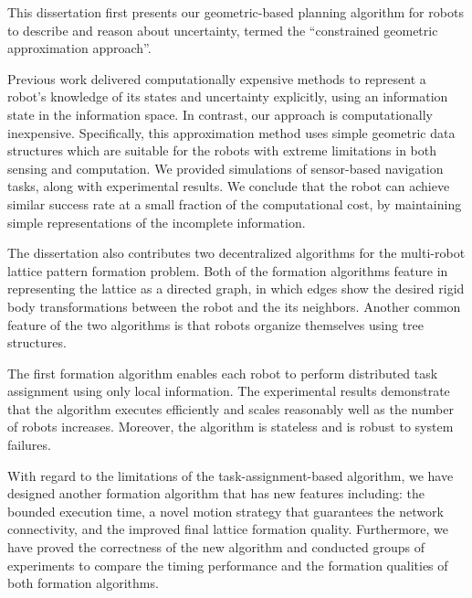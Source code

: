 This dissertation first presents our geometric-based planning algorithm
for robots to describe and reason about
uncertainty, termed the ``constrained geometric approximation approach''.

Previous work delivered computationally expensive methods to represent a robot's
knowledge of its states and uncertainty explicitly, using an information state in
the information space. 
%
In contrast, our approach is computationally inexpensive.
Specifically, this approximation method uses simple geometric data structures 
which are suitable for the robots 
with extreme limitations in both sensing and computation. 
%
We provided simulations of sensor-based navigation
tasks, along with experimental results.
%
We conclude that the robot can achieve similar success rate at a small fraction of the computational cost,
by maintaining simple representations of the incomplete information.
  
The dissertation also contributes two decentralized algorithms for the multi-robot
lattice pattern formation problem. 
%
Both of the formation algorithms feature in representing the lattice as
a directed graph, in which edges show the desired rigid body transformations
between the robot and the its neighbors. 
%
Another common feature of the two algorithms is that robots organize themselves using tree structures. 

The first formation algorithm enables each robot to perform distributed task assignment using
only local information.
%
The experimental results demonstrate that the algorithm executes efficiently and 
scales reasonably well as the number of robots increases.
Moreover, the algorithm is stateless and is robust to system failures.


With regard to the limitations of the task-assignment-based algorithm, 
we have designed another formation algorithm that has new features including:
the bounded execution time, a novel motion strategy that guarantees the network connectivity, 
and the improved final lattice formation quality.
%
Furthermore, we have proved the correctness of the new algorithm and 
conducted groups of experiments to compare the timing performance 
and the formation qualities of both formation algorithms.
